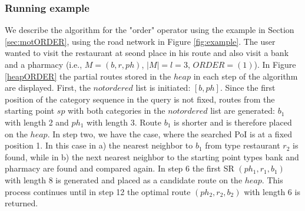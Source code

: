 \subsubsection{Running example}
We describe the algorithm for the "order" operator using the example in Section \ref{sec:motORDER}, using the road network in Figure \ref{fig:example}. The user wanted to visit the restaurant at seond place in his route and also visit a bank and a pharmacy (i.e., $M = (b, r, ph)$, $|M| = l = 3$, $ORDER = (1)$). In Figure \ref{heapORDER} the partial routes stored in the $heap$ in each step of the algorithm are displayed. \newline
First, the $notordered$ list is initiated: $[b, ph]$. Since the first position of the category sequence in the query is not fixed, routes from the starting point $sp$ with both categories in the $notordered$ list are generated: $b_1$ with length 2 and $ph_1$ with length 3. Route $b_1$ is shorter and is therefore placed on the $heap$. In step two, we have the case, where the searched PoI is at a fixed position 1. In this case in a) the nearest neighbor to $b_1$ from type restaurant $r_2$ is found, while in b) the next nearest neighbor to the starting point types bank and pharmacy are found and compared again. In step 6 the first SR $(ph_1, r_1, b_1)$ with length 8 is generated and placed as a candidate route on the $heap$.
This process continues until in step 12 the optimal route $(ph_2, r_2, b_2)$ with length 6 is returned.


